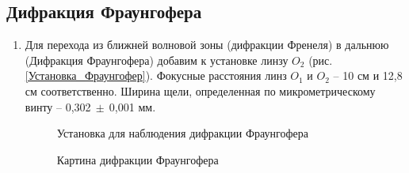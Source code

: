 \documentclass[a4paper, 12pt]{article}
\begin{document}
\subsection{Дифракция Фраунгофера}

\begin{enumerate}
	\item Для перехода из ближней волновой зоны (дифракции Френеля) в дальнюю (Дифракция Фраунгофера) добавим к установке линзу $O_2$ (рис. \ref{Установка_Фраунгофер}). Фокусные расстояния линз $O_1$ и $O_2$ -- 10 см и 12,8 см соответственно. Ширина щели, определенная по микрометрическому винту -- 0,302$~\pm~$0,001 мм.

\clearpage
	\begin{figure}[h!]
	\begin{minipage}{1\textwidth}
		\caption{Установка для наблюдения дифракции Фраунгофера}
	\end{minipage}
	\begin{minipage}{1\textwidth}
		\caption{Картина дифракции Фраунгофера}
	\end{minipage}
	\end{figure}


\end{enumerate}
\end{document}
